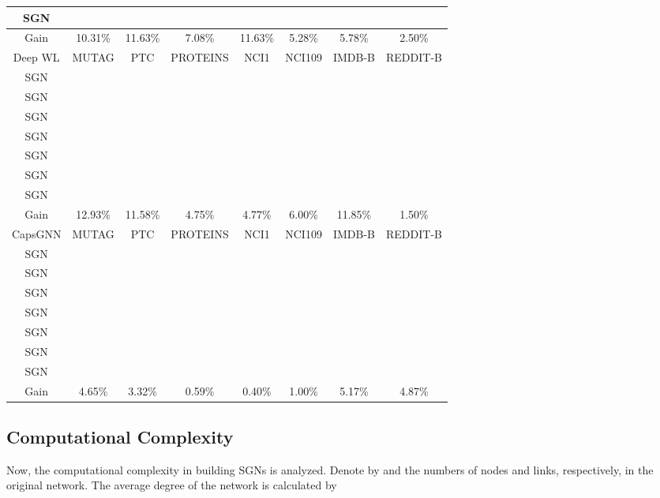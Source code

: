 \documentclass[10pt,journal,compsoc]{IEEEtran}
\begin{document}
\begin{table*}[!t]
\begin{tabular}{c|cccccccc}
\\
\multicolumn{2}{c|}{SGN}&&  &  &  &  &&
\\
\hline
\multicolumn{2}{c|}{Gain}&10.31\%&  11.63\%&  7.08\%&  11.63\%&  5.28\%&  5.78\%&  2.50\%\\
\hline
\multicolumn{2}{c|}{Deep WL}&MUTAG&PTC&PROTEINS&NCI1&NCI109&IMDB-B&REDDIT-B\\
\hline
\multicolumn{2}{c|}{SGN}&&  &  &  &  &  &
\\
\multicolumn{2}{c|}{SGN}&&  &  &  &  &  &
\\
\multicolumn{2}{c|}{SGN}&&  &  &  &  &  &
\\
\multicolumn{2}{c|}{SGN}&&  &  &  &  &  &
\\
\multicolumn{2}{c|}{SGN}&&  &  &  &  &  &
\\
\multicolumn{2}{c|}{SGN}&&  &  &  &  &  &
\\
\multicolumn{2}{c|}{SGN}&&  &  &  &  &  &
\\
\hline
\multicolumn{2}{c|}{Gain}&12.93\%&  11.58\%&  4.75\%&  4.77\%&  6.00\%&  11.85\%&  1.50\%\\
\hline
\multicolumn{2}{c|}{CapsGNN}&MUTAG&PTC&PROTEINS&NCI1&NCI109&IMDB-B&REDDIT-B\\
\hline
\multicolumn{2}{c|}{SGN}&&  &  &  &  &  &
\\
\multicolumn{2}{c|}{SGN}&&  &  &  &  &  &
\\
\multicolumn{2}{c|}{SGN}&&  &  & &  &  &
\\
\multicolumn{2}{c|}{SGN}&&  &  &  &  &  &
\\
\multicolumn{2}{c|}{SGN}&&  &  & &  &  &
\\
\multicolumn{2}{c|}{SGN}&&  &  &  &  &  &
\\
\multicolumn{2}{c|}{SGN}&& &  &  & &  &
\\
\hline
\multicolumn{2}{c|}{Gain}&4.65\%& 3.32\%&  0.59\%&  0.40\%&  1.00\%&  5.17\%&  4.87\%\\

\hline\hline
\end{tabular}
\label{Table2}
\end{table*}

\subsection{Computational Complexity}
Now, the computational complexity in building SGNs is analyzed. Denote by  and  the numbers of nodes and links, respectively, in the original network. The average degree of the network is calculated by
\end{document}
